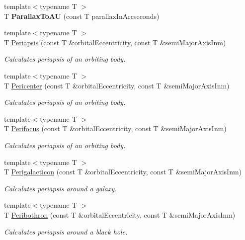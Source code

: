 \begin{DoxyCompactItemize}
{\footnotesize template$<$typename T $>$ }\\T {\bfseries Parallax\+To\+AU} (const T parallax\+In\+Arcseconds)
\item 
{\footnotesize template$<$typename T $>$ }\\T \mbox{\hyperlink{group___e_g_x_phys-_periapsis_gad487212733711bc2ce73c8137c9309c3}{Periapsis}} (const T \&orbital\+Eccentricity, const T \&semi\+Major\+Axis\+Inm)
\begin{DoxyCompactList}\small\item\em Calculates periapsis of an orbiting body. \end{DoxyCompactList}\item 
{\footnotesize template$<$typename T $>$ }\\T \mbox{\hyperlink{group___e_g_x_phys-_periapsis_gaa769950fdad108083236bb0efded1196}{Pericenter}} (const T \&orbital\+Eccentricity, const T \&semi\+Major\+Axis\+Inm)
\begin{DoxyCompactList}\small\item\em Calculates periapsis of an orbiting body. \end{DoxyCompactList}\item 
{\footnotesize template$<$typename T $>$ }\\T \mbox{\hyperlink{group___e_g_x_phys-_periapsis_ga569c67766dd7b590c630caa6582ad000}{Perifocus}} (const T \&orbital\+Eccentricity, const T \&semi\+Major\+Axis\+Inm)
\begin{DoxyCompactList}\small\item\em Calculates periapsis of an orbiting body. \end{DoxyCompactList}\item 
{\footnotesize template$<$typename T $>$ }\\T \mbox{\hyperlink{group___e_g_x_phys-_periapsis_ga05df9ab5aa8e1efa938f740b894ade25}{Perigalacticon}} (const T \&orbital\+Eccentricity, const T \&semi\+Major\+Axis\+Inm)
\begin{DoxyCompactList}\small\item\em Calculates periapsis around a galaxy. \end{DoxyCompactList}\item 
{\footnotesize template$<$typename T $>$ }\\T \mbox{\hyperlink{group___e_g_x_phys-_periapsis_gad43bb3a6be82521d41d7a55453dec47e}{Peribothron}} (const T \&orbital\+Eccentricity, const T \&semi\+Major\+Axis\+Inm)
\begin{DoxyCompactList}\small\item\em Calculates periapsis around a black hole. \end{DoxyCompactList}\item 

\end{DoxyCompactItemize}
